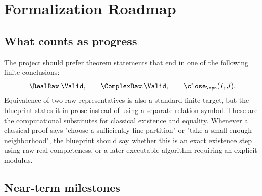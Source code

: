 \chapter*{Formalization Roadmap}

\section{What counts as progress}

The project should prefer theorem statements that end in one of the following
finite conclusions:
\[
  \RealRaw.\Valid,\qquad
  \ComplexRaw.\Valid,\qquad
  \close_\eps(I,J).
\]
Equivalence of two raw representatives is also a standard finite target, but
the blueprint states it in prose instead of using a separate relation symbol.
These are the computational substitutes for classical existence and equality.
Whenever a classical proof says "choose a sufficiently fine partition" or
"take a small enough neighborhood", the blueprint should say whether this is
an exact existence step using raw-real completeness, or a later executable
algorithm requiring an explicit modulus.

\section{Near-term milestones}

